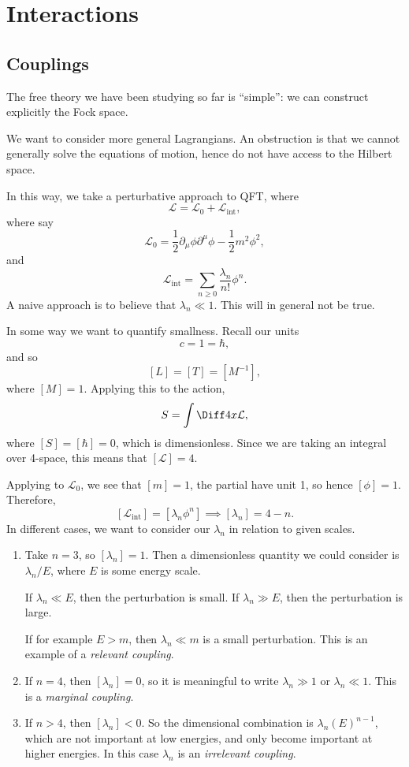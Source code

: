 \documentclass[12pt]{article}
\begin{document}
\newpage

\section{Interactions}%
\label{sec:ints}

\subsection{Couplings}%
\label{sub:cups}

The free theory we have been studying so far is ``simple'': we can construct explicitly the Fock space.

We want to consider more general Lagrangians. An obstruction is that we cannot generally solve the equations of motion, hence do not have access to the Hilbert space.

In this way, we take a perturbative approach to QFT, where
\[
\mathcal{L} = \mathcal{L}_0 + \mathcal{L}_{\mathrm{int}},
\]
where say
\[
\mathcal{L}_0 = \frac{1}{2} \partial_\mu \phi \partial^\mu \phi - \frac{1}{2} m^2 \phi^2,
\]
and
\[
\mathcal{L}_{\mathrm{int}} = \sum_{n \geq 0} \frac{\lambda_n}{n!} \phi^n.
\]
A naive approach is to believe that $\lambda_n \ll 1$. This will in general not be true.

In some way we want to quantify smallness. Recall our units
\[
c = 1 = \hbar,
\]
and so
\[
	[L] = [T] = [M^{-1}],
\]
where $[M] = 1$. Applying this to the action,
\[
S = \int \Diff 4 x \mathcal{L},
\]
where $[S] = [\hbar] = 0$, which is dimensionless. Since we are taking an integral over 4-space, this means that $[\mathcal{L}] = 4$.

Applying to $\mathcal{L}_0$, we see that $[m] = 1$, the partial have unit 1, so hence $[\phi] = 1$. Therefore,
\[
	[\mathcal{L}_{\mathrm{int}}] = [\lambda_n \phi^n] \implies [\lambda_n] = 4 - n.
\]
In different cases, we want to consider our $\lambda_n$ in relation to given scales.
\begin{enumerate}
	\item Take $n = 3$, so $[\lambda_n] = 1$. Then a dimensionless quantity we could consider is $\lambda_n/E$, where $E$ is some energy scale.

		If $\lambda_n \ll E$, then the perturbation is small. If $\lambda_n \gg E$, then the perturbation is large.

		If for example $E > m$, then $\lambda_n \ll m$ is a small perturbation. This is an example of a \emph{relevant coupling}.
	\item If $n = 4$, then $[\lambda_n] = 0$, so it is meaningful to write $\lambda_n \gg 1$ or $\lambda_n \ll 1$. This is a \emph{marginal coupling}.
	\item If $n > 4$, then $[\lambda_n] < 0$. So the dimensional combination is $\lambda_n(E)^{n-1}$, which are not important at low energies, and only become important at higher energies. In this case $\lambda_n$ is an \emph{irrelevant coupling}.
\end{enumerate}
\end{document}
